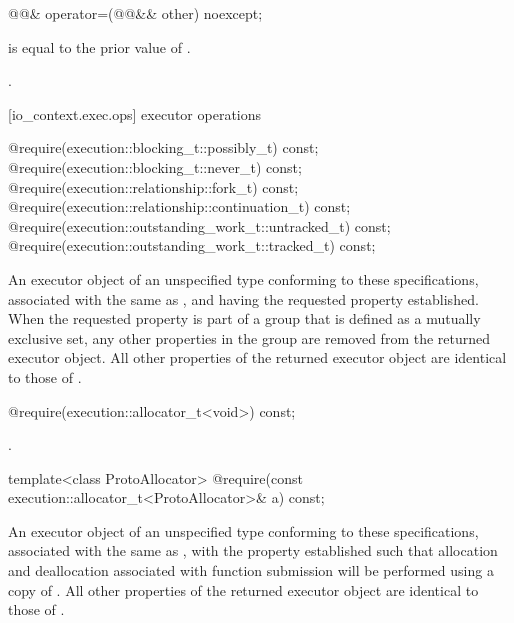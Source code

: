 \begin{itemdecl}
@@& operator=(@@&& other) noexcept;
\end{itemdecl}

\begin{itemdescr}
\pnum
\postconditions {} is equal to the prior value of .

\pnum
\returns {}.
\end{itemdescr}



[io_context.exec.ops]{ executor operations}

\begin{itemdecl}
@\seebelow@ require(execution::blocking_t::possibly_t) const;
@\seebelow@ require(execution::blocking_t::never_t) const;
@\seebelow@ require(execution::relationship::fork_t) const;
@\seebelow@ require(execution::relationship::continuation_t) const;
@\seebelow@ require(execution::outstanding_work_t::untracked_t) const;
@\seebelow@ require(execution::outstanding_work_t::tracked_t) const;
\end{itemdecl}

\begin{itemdescr}
\pnum
\returns An executor object of an unspecified type conforming to these specifications, associated with the same  as , and having the requested property established. When the requested property is part of a group that is defined as a mutually exclusive set, any other properties in the group are removed from the returned executor object. All other properties of the returned executor object are identical to those of .
\end{itemdescr}

\begin{itemdecl}
@\seebelow@ require(execution::allocator_t<void>) const;
\end{itemdecl}

\begin{itemdescr}
\pnum
\returns {}.
\end{itemdescr}

\begin{itemdecl}
template<class ProtoAllocator>
  @\seebelow@ require(const execution::allocator_t<ProtoAllocator>& a) const;
\end{itemdecl}

\begin{itemdescr}
\pnum
\returns An executor object of an unspecified type conforming to these specifications, associated with the same  as , with the  property established such that allocation and deallocation associated with function submission will be performed using a copy of . All other properties of the returned executor object are identical to those of .
\end{itemdescr}

